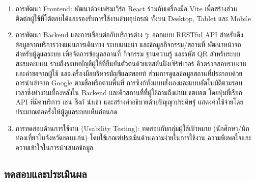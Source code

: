 \begin{enumerate}
\item การพัฒนา Frontend: พัฒนาด้วยเฟรมเวิร์ก React ร่วมกับเครื่องมือ Vite เพื่อสร้างส่วนติดต่อผู้ใช้ที่โต้ตอบได้และรองรับการใช้งานข้ามอุปกรณ์ ทั้งบน Desktop, Tablet และ Mobile
\item การพัฒนา Backend และการเชื่อมต่อกับบริการต่าง ๆ: ออกแบบ RESTful API สำหรับดึงข้อมูลจากบริการวางแผนการเดินทาง ระบบแนะนำ และข้อมูลกิจกรรม/สถานที่ พัฒนาหน้าจอสำหรับผู้ดูแลระบบ เพื่อจัดการข้อมูลสถานที่ กิจกรรม ฐานความรู้ และรหัส QR สำหรับระบบสะสมคะแนน รวมถึงระบบบัญชีผู้ใช้ที่ยืนยันตัวตนด้วยเซสชันฝั่งเซิร์ฟเวอร์ คิวตรวจสอบรายงานและคำขอจากผู้ใช้ และเครื่องมือบริหารบัญชีและพอยท์ ส่วนการดูแลข้อมูลสถานที่ประกอบด้วยการนำเข้าจาก Google ตามชื่อหรือตามพื้นที่ การซิงก์ทั้งแบบสั่งเองและแบบอัตโนมัติตามรอบเวลาซึ่งทำงานเบื้องหลังใน Backend และคิวสถานที่ที่ผู้ใช้ถามถึงผ่านแชตบอต โดยปุ่มที่เรียก API ที่มีค่าบริการ เช่น ซิงก์ นำเข้า และสร้างคำอธิบายด้วยปัญญาประดิษฐ์ แสดงค่าใช้จ่ายโดยประมาณต่อครั้งให้ผู้ดูแลระบบเห็นก่อนกด
\item การทดสอบด้านการใช้งาน (Usability Testing): ทดสอบกับกลุ่มผู้ใช้เป้าหมาย (นักศึกษา/นักท่องเที่ยวในจังหวัดขอนแก่น) โดยใช้เกณฑ์ประเมินด้านความง่ายในการใช้งาน ความพึงพอใจและความเข้าใจในการนำเสนอข้อมูล
\end{enumerate}

\subsection{ทดสอบและประเมินผล}

